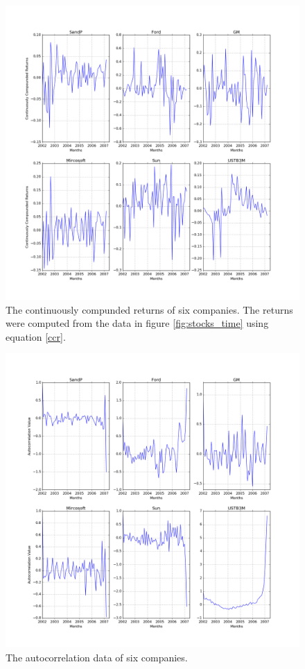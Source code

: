 \message{ !name(Assn2.tex)}\documentclass[twocolumn]{article}
\begin{document}
\begin{figure}
  \includegraphics[width=\linewidth]{stocks_returns.png}
  \caption{
    The continuously compunded returns of six companies. The returns were
    computed from the data in figure \ref{fig:stocks_time} using equation
    \ref{ccr}.
  }
  \label{fig:stocks_returns}
\end{figure}

\begin{figure}
  \includegraphics[width=\linewidth]{stocks_ac.png}
  \caption{
    The autocorrelation data of six companies.
  }
  \label{fig:stocks_ac}
\end{figure}
\end{document}
